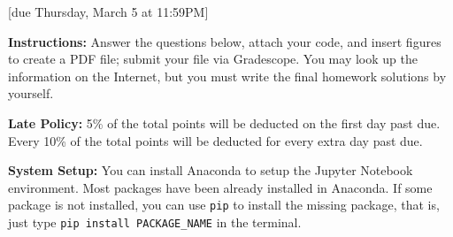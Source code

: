 \documentclass{article}
\begin{document}
[due Thursday, March 5 at 11:59PM]

\textbf{Instructions:} Answer the questions below, attach your code, and insert figures to create a PDF file; submit your file via Gradescope. You may look up the information on the Internet, but you must write the final homework solutions by yourself.

\textbf{Late Policy:} 5\% of the total points will be deducted on the first day past due. Every 10\% of the total points will be deducted for every extra day past due.

\textbf{System Setup:} You can install Anaconda to setup the Jupyter Notebook environment. Most packages have been already installed in Anaconda. If some package is not installed, you can use \texttt{pip} to install the missing package, that is, just type \texttt{pip install PACKAGE\_NAME} in the terminal.

\vspace{1em}
\end{document}
